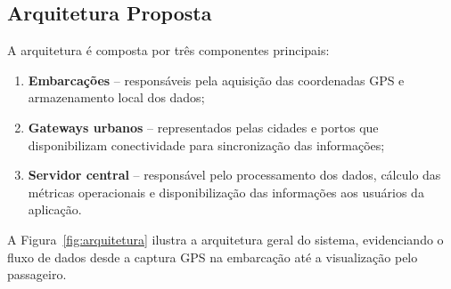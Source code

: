 \documentclass[12pt]{article}
\begin{document}
\subsection{Arquitetura Proposta}
A arquitetura é composta por três componentes principais:

\begin{enumerate}
\item \textbf{Embarcações} -- responsáveis pela aquisição das coordenadas GPS e armazenamento local dos dados;
\item \textbf{Gateways urbanos} -- representados pelas cidades e portos que disponibilizam conectividade para sincronização das informações;
\item \textbf{Servidor central} -- responsável pelo processamento dos dados, cálculo das métricas operacionais e disponibilização das informações aos usuários da aplicação.
\end{enumerate}

A Figura~\ref{fig:arquitetura} ilustra a arquitetura geral do sistema, evidenciando o fluxo de dados desde a captura GPS na embarcação até a visualização pelo passageiro.
\end{document}
